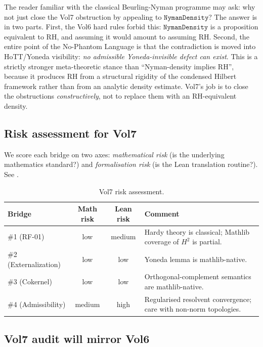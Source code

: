 \documentclass[11pt]{article}
\theoremstyle{plain}
\theoremstyle{definition}
\theoremstyle{remark}
\newcommand{\HtH}{H^{2}}
\newcommand{\code}[1]{\texttt{#1}}
\begin{document}
The reader familiar with the classical Beurling-Nyman programme may
ask: why not just close the Vol7 obstruction by appealing to
\(\code{NymanDensity}\)?  The answer is in two parts.  First, the
Vol6 hard rules forbid this: \(\code{NymanDensity}\) is a
proposition equivalent to RH, and assuming it would amount to
assuming RH.  Second, the entire point of the No-Phantom Language
is that the contradiction is moved into HoTT/Yoneda visibility:
\emph{no admissible Yoneda-invisible defect can exist}.  This is a
strictly stronger meta-theoretic stance than ``Nyman-density implies
RH'', because it produces RH from a structural rigidity of the
condensed Hilbert framework rather than from an analytic density
estimate.  Vol7's job is to close the obstructions
\emph{constructively}, not to replace them with an RH-equivalent
density.

\subsection{Risk assessment for Vol7}

We score each bridge on two axes: \emph{mathematical risk} (is the
underlying mathematics standard?) and \emph{formalisation risk} (is
the Lean translation routine?).  See .

\begin{table}[h]
\centering
\begin{tabular}{@{}l c c l@{}}
\toprule
Bridge & Math risk & Lean risk & Comment \\
\midrule
\#1 (RF-01)            & low  & medium &
   Hardy theory is classical; Mathlib coverage of
   \(\HtH\) is partial. \\
\#2 (Externalization)   & low  & low &
   Yoneda lemma is mathlib-native. \\
\#3 (Cokernel)          & low  & low &
   Orthogonal-complement semantics are mathlib-native. \\
\#4 (Admissibility)     & medium & high &
   Regularised resolvent convergence; care with non-norm topologies. \\
\bottomrule
\end{tabular}
\caption{Vol7 risk assessment.}
\label{tab:vol7-risk}
\end{table}

\subsection{Vol7 audit will mirror Vol6}
\end{document}
